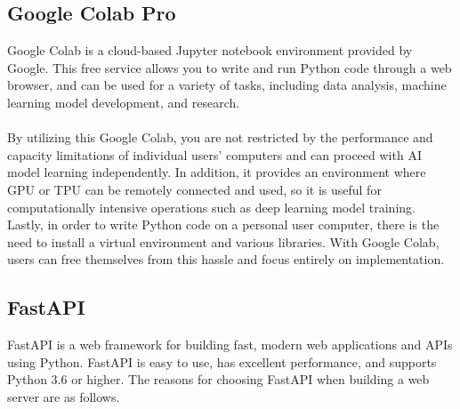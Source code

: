 \subsection{\textbf{Google Colab Pro}}
Google Colab is a cloud-based Jupyter notebook environment provided by Google. This free service allows you to write and run Python code through a web browser, and can be used for a variety of tasks, including data analysis, machine learning model development, and research.
\\

\\
By utilizing this Google Colab, you are not restricted by the performance and capacity limitations of individual users' computers and can proceed with AI model learning independently. In addition, it provides an environment where GPU or TPU can be remotely connected and used, so it is useful for computationally intensive operations such as deep learning model training. Lastly, in order to write Python code on a personal user computer, there is the need to install a virtual environment and various libraries. With Google Colab, users can free themselves from this hassle and focus entirely on implementation.\\

\subsection{\textbf{FastAPI}}
FastAPI is a web framework for building fast, modern web applications and APIs using Python. FastAPI is easy to use, has excellent performance, and supports Python 3.6 or higher. The reasons for choosing FastAPI when building a web server are as follows. 
\\


